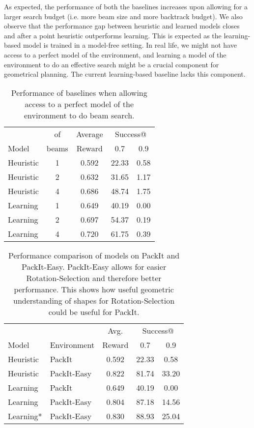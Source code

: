 \documentclass{article}
\begin{document}
As expected, the performance of both the baselines increases upon allowing for a larger search budget (i.e. more beam size and more backtrack budget). We also observe that the performance gap between heuristic and learned models closes and after a point heuristic outperforms learning. This is expected as the learning-based model is trained in a model-free setting. In real life, we might not have access to a perfect model of the environment, and learning a model of the environment to do an effective search might be a crucial component for geometrical planning. The current learning-based baseline lacks this component.
\begin{table}[t]
    \centering
    \begin{center}
    \begin{tabular}{l||c|c|cc}
    \hline
          &  of & Average & \multicolumn{2}{c}{Success@}  \\
    Model  & beams & Reward  & 0.7 & 0.9 \\
     \hline \hline
    Heuristic & 1 & 0.592 & 22.33 & 0.58 \\
    Heuristic & 2 & 0.632 & 31.65 & 1.17 \\
    Heuristic & 4 & 0.686 & 48.74 & 1.75 \\
    \hline
    Learning  & 1 & 0.649 & 40.19 & 0.00 \\
    Learning  & 2 & 0.697 & 54.37 & 0.19 \\
    Learning  & 4 & 0.720 & 61.75 & 0.39 \\
    \hline
    \end{tabular}
    \end{center}
    \caption{Performance of baselines when allowing access to a perfect model of the environment to do beam search{\footnotemark[3]}.}
    \label{tab:beam}
\end{table}
\begin{table}[t]
    \centering
    \begin{center}
    \begin{tabular}{ll||c|cc}
    \hline
     & &  Avg. & \multicolumn{2}{c}{Success@}  \\
     Model & Environment & Reward & 0.7 & 0.9 \\
     \hline \hline
     Heuristic&PackIt      & 0.592 & 22.33 & 0.58 \\
     Heuristic&PackIt-Easy & 0.822 & 81.74 & 33.20 \\
     \hline
     Learning&PackIt       & 0.649 & 40.19 & 0.00  \\
     Learning&PackIt-Easy  & 0.804 & 87.18 & 14.56 \\
     Learning*&PackIt-Easy & 0.830 & 88.93 & 25.04 \\
    \hline
    \end{tabular}
    \end{center}
    \caption{Performance comparison of models on PackIt and PackIt-Easy. PackIt-Easy allows for easier Rotation-Selection and therefore better performance. This shows how useful geometric understanding of shapes for Rotation-Selection could be useful for PackIt{\footnotemark[3]}{\footnotemark[4]}.}
    \label{tab:packit_easy}
\end{table}
\end{document}
